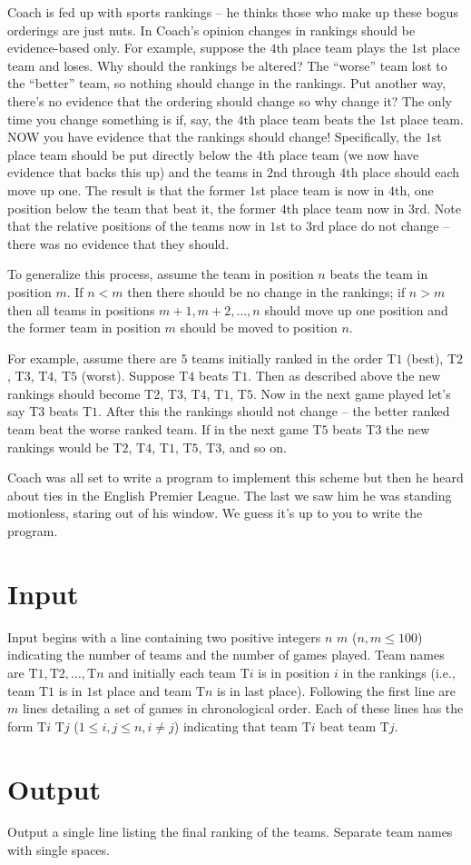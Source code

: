 
Coach is fed up with sports rankings -- he thinks those who make up these bogus orderings are just nuts.  In Coach's opinion changes in rankings should be evidence-based only.  For example, suppose the $4$th place team plays the $1$st place team and loses.  Why should the rankings be altered? The ``worse'' team lost to the ``better'' team, so nothing should change in the rankings.  Put another way, there's no evidence that the ordering should change so why change it?  The only time you change something is if, say, the $4$th place team beats the $1$st place team.  NOW you have evidence that the rankings should change!  Specifically, the $1$st place team should be put directly below the $4$th place team (we now have evidence that backs this up) and the teams in $2$nd through $4$th place should each move up one.  The result is that the former $1$st place team is now in $4$th, one position below the team that beat it, the former $4$th place team now in $3$rd.  Note that the relative positions of the teams now in $1$st to $3$rd place do not change -- there was no evidence that they should.

To generalize this process, assume the team in position $n$ beats the team in position $m$.  If $n < m$ then there should be no change in the rankings; if $n > m$ then all teams in positions $m+1, m+2, \ldots, n$ should move up one position and the former team in position $m$ should be moved to position $n$.

For example, assume there are $5$ teams initially ranked in the order T$1$ (best), T$2$, T$3$, T$4$, T$5$ (worst).  Suppose T$4$ beats T$1$.  Then as described above the new rankings should become T$2$, T$3$, T$4$, T$1$, T$5$.  Now in the next game played let's say T$3$ beats T$1$. After this the rankings should not change -- the better ranked team beat the worse ranked team.  If in the next game T$5$ beats T$3$ the new rankings would be T$2$, T$4$, T$1$, T$5$, T$3$, and so on.

Coach was all set to write a program to implement this scheme but then he heard about ties in the English Premier League.  The last we saw him he was standing motionless, staring out of his window.  We guess it's up to you to write the program.

\section*{Input}

Input begins with a line containing two positive integers $n$ $m$ ($n, m \leq 100$) indicating the number of teams and the number of games played.  Team names are $\mbox{T}1, \mbox{T}2, \ldots, \mbox{T}n$ and initially each team $\mbox{T}i$ is in position $i$ in the rankings (i.e., team $\mbox{T}1$ is in $1$st place and team $\mbox{T}n$ is in last place).  Following the first line are $m$ lines detailing a set of games in chronological order.  Each of these lines has the form $\mbox{T}i$ $\mbox{T}j$ ($1 \leq i,j \leq n, i \neq j$) indicating that team $\mbox{T}i$ beat team $\mbox{T}j$.

\section*{Output}

Output a single line listing the final ranking of the teams. Separate team names with single spaces.
